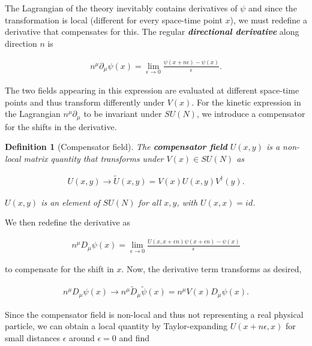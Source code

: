 \documentclass{article}
\theoremstyle{plain} %
\newtheorem{definition}{Definition}[section]
\theoremstyle{convention} %
\theoremstyle{remark} %
\def\df#1{\textbf{\textit{#1}}}
\numberwithin{equation}{section}
\begin{document}
The Lagrangian of the theory inevitably contains derivatives of $\psi$ and since the transformation is local (different for every space-time point $x$), we must redefine a derivative that compensates for this. The regular \df{directional derivative} along direction $n$ is

\begin{align}
    n^{\mu} \partial_{\mu} \psi(x) = \lim_{\epsilon \to 0} \frac{ \psi(x + n \epsilon) - \psi(x) }{\epsilon}.\label{eq:dir_derivative}
\end{align}

The two fields appearing in this expression are evaluated at different space-time points and thus transform differently under $V(x)$. For the kinetic expression in the Lagrangian $n^{\mu} \partial_{\mu}$ to be invariant under $SU(N)$, we introduce a compensator for the shifts in the derivative.

\begin{definition}[Compensator field]

The \df{compensator field} $U(x,y)$ is a non-local matrix quantity that transforms under $V(x) \in SU(N)$ as

\begin{align}
    U(x,y) \longrightarrow \tilde{U}(x,y) = V(x) U(x,y) V^{\dagger}(y).\label{eq:trafo_compensator}
\end{align}

$U(x,y)$ is an element of $SU(N)$ for all $x,y$, with $U(x,x) = id$.

\end{definition}

We then redefine the derivative as

\begin{align}
    n^{\mu} D_{\mu} \psi(x) = \lim_{\epsilon \to 0} \frac{ U(x,x + \epsilon n) \psi(x + \epsilon n) - \psi(x) }{\epsilon} \label{eq:cov_derivative1}
\end{align}

to compensate for the shift in $x$. Now, the derivative term transforms as desired,

\begin{align*}
    n^{\mu} D_{\mu} \psi(x) \longrightarrow n^{\mu} \tilde{D}_{\mu} \tilde{\psi}(x) = n^{\mu} V(x) D_{\mu} \psi(x).
\end{align*}

Since the compensator field is non-local and thus not representing a real physical particle, we can obtain a local quantity by Taylor-expanding $U(x + n \epsilon, x)$ for small distances $\epsilon$ around $\epsilon = 0$ and find
\end{document}
